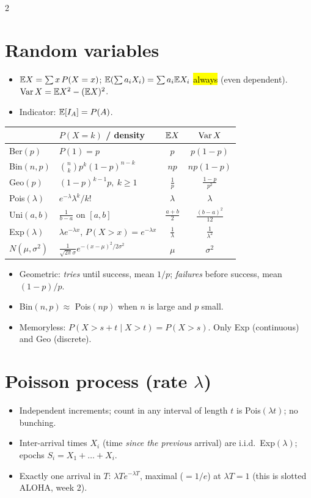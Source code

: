 \begin{multicols}{2}
\section{Random variables}
\begin{itemize}
  \item $\mathbb{E} X=\sum x\,P(X=x)$; $\mathbb{E}(\sum a_iX_i)=\sum a_i\mathbb{E} X_i$ \hl{always} (even dependent). $\operatorname{Var} X=\mathbb{E} X^2-(\mathbb{E} X)^2$.
  \item Indicator: $\mathbb{E}[I_A]=P(A)$.
\end{itemize}
\begin{center}\footnotesize
\renewcommand{\arraystretch}{1.25}
\begin{tabular}{@{}l l c c@{}}
\toprule
 & $P(X=k)$ / density & $\mathbb{E} X$ & $\operatorname{Var} X$\\\midrule
Ber$(p)$ & $P(1)=p$ & $p$ & $p(1-p)$\\
Bin$(n,p)$ & $\binom nkp^k(1-p)^{n-k}$ & $np$ & $np(1-p)$\\
Geo$(p)$ & $(1-p)^{k-1}p,\ k\ge1$ & $\frac1p$ & $\frac{1-p}{p^2}$\\
Pois$(\lambda)$ & $e^{-\lambda}\lambda^k/k!$ & $\lambda$ & $\lambda$\\\midrule
Uni$(a,b)$ & $\frac1{b-a}$ on $[a,b]$ & $\frac{a+b}2$ & $\frac{(b-a)^2}{12}$\\
Exp$(\lambda)$ & $\lambda e^{-\lambda x}$, $P(X>x)=e^{-\lambda x}$ & $\frac1\lambda$ & $\frac1{\lambda^2}$\\
$N(\mu,\sigma^2)$ & $\frac{1}{\sqrt{2\pi}\sigma}e^{-(x-\mu)^2/2\sigma^2}$ & $\mu$ & $\sigma^2$\\\bottomrule
\end{tabular}
\end{center}
\begin{itemize}
  \item Geometric: \emph{tries} until success, mean $1/p$; \emph{failures} before success, mean $(1-p)/p$.
  \item Bin$(n,p)\approx$ Pois$(np)$ when $n$ is large and $p$ small.
  \item Memoryless: $P(X>s+t\mid X>t)=P(X>s)$. Only Exp (continuous) and Geo (discrete).
\end{itemize}

\section{Poisson process (rate $\lambda$)}
\begin{itemize}
  \item Independent increments; count in any interval of length $t$ is Pois$(\lambda t)$; no bunching.
  \item Inter-arrival times $X_i$ (time \emph{since the previous} arrival) are i.i.d.\ Exp$(\lambda)$; epochs $S_i=X_1+\dots+X_i$.
  \item Exactly one arrival in $T$: $\lambda T e^{-\lambda T}$, maximal ($=1/e$) at $\lambda T=1$ (this is slotted ALOHA, week 2).
\end{itemize}


\end{multicols}
